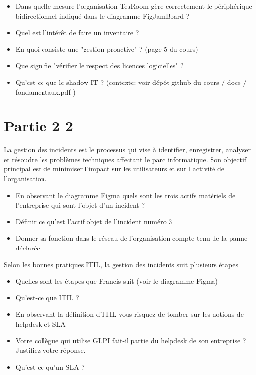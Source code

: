 \documentclass[12pt, letterpaper]{article}
\begin{document}
\begin{itemize}
    \item Dans quelle mesure l'organisation TeaRoom gère correctement le périphérique bidirectionnel indiqué dans le diagramme FigJamBoard ?
\end{itemize}


\begin{itemize}
    \item Quel est l'intérêt de faire un inventaire ?
    \item En quoi consiste une "gestion proactive" ? (page 5 du cours)
    \item Que signifie "vérifier le respect des licences logicielles" ?
    \item Qu'est-ce que le shadow IT ? (contexte: voir dépôt github du cours / docs / fondamentaux.pdf )
\end{itemize}


\section*{Partie 2 2}

\begin{tcolorbox}[colback=cyan!5,colframe=cyan!60!black,title=Définition]
La gestion des incidents est le processus qui vise à identifier, enregistrer, analyser et résoudre les problèmes techniques affectant le parc informatique. Son objectif principal est de minimiser l’impact sur les utilisateurs et sur l’activité de l’organisation.
\end{tcolorbox}

\begin{itemize}
    \item En observant le diagramme Figma quels sont les trois actifs matériels de l'entreprise qui sont l'objet d'un incident ?
    \item Définir ce qu'est l'actif objet de l'incident numéro 3
    \item Donner sa fonction dans le réseau de l'organisation compte tenu de la panne déclarée
\end{itemize}

\begin{tcolorbox}[colback=cyan!5,colframe=cyan!60!black,title=ITIL]
Selon les bonnes pratiques ITIL, la gestion des incidents suit plusieurs étapes 
\end{tcolorbox}

\begin{itemize}
    \item Quelles sont les étapes que Francis suit (voir le diagramme Figma)
    \item Qu'est-ce que ITIL ?
    \item En observant la définition d'ITIL vous risquez de tomber sur les notions de helpdesk et SLA
    \item Votre collègue qui utilise GLPI fait-il partie du helpdesk de son entreprise ? Justifiez votre réponse.
    \item Qu'est-ce qu'un SLA ?
\end{itemize}
\end{document}
